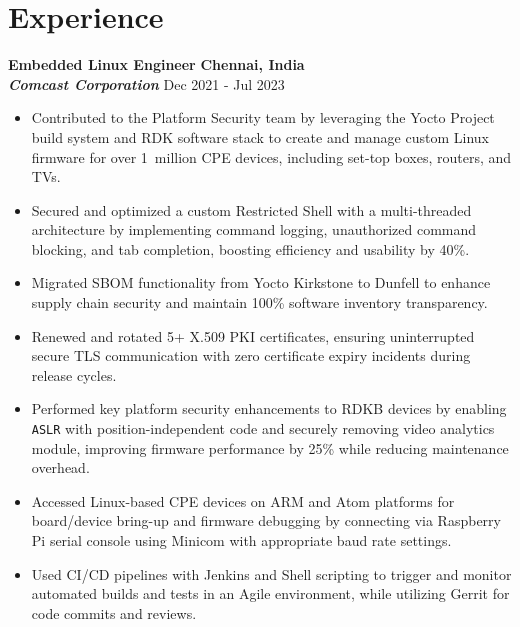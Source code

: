 \documentclass[10pt, letterpad, sans]{extarticle}
\newcommand{\cmpnysection}[4] {
	\raggedright{\normalsize\bfseries{#3}}
	\hfill {\small \textbf{#2}} \\
	{\textit{\bfseries #1}}
	\hfill {\small #4} \\
}
\begin{document}
\section{Experience}
\cmpnysection
{Comcast Corporation}
{Chennai, India}
{Embedded Linux Engineer}
{Dec 2021 - Jul 2023}
\begin{itemize}[leftmargin=6mm]
	\item{Contributed to the Platform Security team by leveraging the Yocto Project build system and RDK software stack to create and manage custom Linux firmware for over \mbox{1 million} CPE devices, including set-top boxes, routers, and TVs.}
	\item {Secured and optimized a custom Restricted Shell with a multi-threaded architecture by implementing command logging, unauthorized command blocking, and tab completion, boosting efficiency and usability by 40\%.}
	\item{Migrated SBOM functionality from Yocto Kirkstone to Dunfell to enhance supply chain security and maintain 100\% software inventory transparency.}
	\item{Renewed and rotated 5+ X.509 PKI certificates, ensuring uninterrupted secure TLS communication with zero certificate expiry incidents during release cycles.}
	\item{Performed key platform security enhancements to RDKB devices by enabling \texttt{ASLR} with position-independent code and securely removing video analytics module, improving firmware performance by 25\% while reducing maintenance overhead.}
	\item{Accessed Linux-based CPE devices on ARM and Atom platforms for board/device bring-up and firmware debugging by connecting via Raspberry Pi serial console using Minicom with appropriate baud rate settings.}
	\item{Used CI/CD pipelines with Jenkins and Shell scripting to trigger and monitor automated builds and tests in an Agile environment, while utilizing Gerrit for code commits and reviews.}
\end{itemize}
\end{document}
